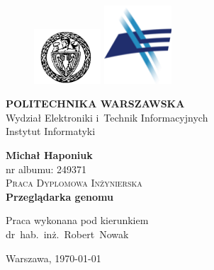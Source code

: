 \documentclass[a4paper,12pt,oneside]{mwrep}  %
\begin{document}
 

\begin{titlepage} 

\begin{figure}
        \includegraphics[width=2.5cm]{grafika/logo_pw} \hfill
        \includegraphics[width=2.5cm]{grafika/logo_weiti}
\end{figure}

\begin{center}

\LARGE{\textbf{POLITECHNIKA WARSZAWSKA}}\\
\Large{Wydział Elektroniki i~Technik Informacyjnych}\\
\large{Instytut Informatyki}				%

\vfill

\vfill
\huge \textbf{Michał Haponiuk}\\  						 %
\large{nr albumu: 249371}\\[1cm] 						 %

\textsc{\Large Praca Dyplomowa Inżynierska}\\[1,5cm]     %

\huge \textbf{Przeglądarka genomu}\\[2cm] %

\vfill

\begin{flushright}
\large{Praca wykonana pod kierunkiem\\
dr~hab.~inż.~Robert~Nowak}\\[1cm] 
\end{flushright}


\large{Warszawa, \today}

\end{center}
\end{titlepage} 
\end{document}
